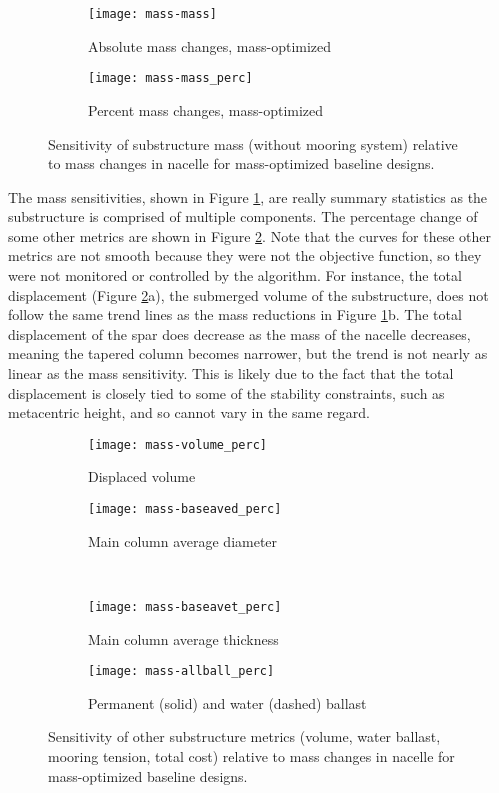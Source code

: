 \begin{figure}[htb]
  \begin{subfigure}[b]{0.49\linewidth}
    \centering \texttt{[image: mass-mass]}
    \caption{Absolute mass changes, mass-optimized}
  \end{subfigure}
  \begin{subfigure}[b]{0.49\linewidth}
    \centering \texttt{[image: mass-mass\_perc]}
    \caption{Percent mass changes, mass-optimized}
  \end{subfigure}
  \caption{Sensitivity of substructure mass (without mooring system)
    relative to mass changes in nacelle for mass-optimized baseline designs.}
  \label{fig:mass-mass}
\end{figure}

The mass sensitivities, shown in
Figure \ref{fig:mass-mass}, are really summary statistics as the
substructure is comprised of multiple components.  The percentage change
of some other metrics are shown in Figure \ref{fig:mass-other}.  Note
that the curves for these other metrics are not smooth because they were
not the objective function, so they were not monitored or controlled by the
algorithm.  For instance, the total displacement (Figure
\ref{fig:mass-other}a), the submerged volume of the substructure, does
not follow the same trend lines as the mass reductions in Figure
\ref{fig:mass-mass}b.  The total displacement of the spar does decrease
as the mass of the nacelle decreases, meaning the tapered column becomes
narrower, but the trend is not nearly as linear as the mass sensitivity.
This is likely due to the fact that the total displacement is closely
tied to some of the stability constraints, such as metacentric height,
and so cannot vary in the same regard.

\begin{figure}[htb]
  \begin{subfigure}[b]{0.49\linewidth}
    \centering \texttt{[image: mass-volume\_perc]}
    \caption{Displaced volume}
  \end{subfigure}
  \begin{subfigure}[b]{0.49\linewidth}
    \centering \texttt{[image: mass-baseaved\_perc]}
    \caption{Main column average diameter}
  \end{subfigure}\\
  \begin{subfigure}[b]{0.49\linewidth}
    \centering \texttt{[image: mass-baseavet\_perc]}
    \caption{Main column average thickness}
  \end{subfigure}
  \begin{subfigure}[b]{0.49\linewidth}
    \centering \texttt{[image: mass-allball\_perc]}
    \caption{Permanent (solid) and water (dashed) ballast}
  \end{subfigure}
  \caption{Sensitivity of other substructure metrics (volume, water
    ballast, mooring tension, total cost) relative to mass changes in
    nacelle for mass-optimized baseline designs.}
  \label{fig:mass-other}
\end{figure}

